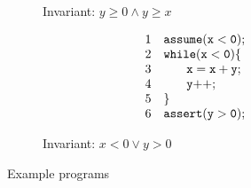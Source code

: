 \begin{figure}[t]
\begin{subfigure}{0.5\textwidth}
\[\begin{array}{ll}
\end{array}
\]
    \caption{Invariant: $y \geq 0 \land y \geq x$}
  \end{subfigure}%
   \begin{subfigure}{0.5\textwidth}
     \vspace{0.3cm}
      \[
      \begin{array}{ll}
      1 & \code{assume(x < 0);} \\
      2 & \code{while(x < 0)\{}  \\
      3 & \code{~~~ \quad x = x + y;}  \\
      4 & \code{~~~ \quad y{++};}  \\
      5 & \code{\}} \\
      6 & \code{assert(y > 0);}
      \end{array}
    \]
    \caption{Invariant: $x < 0 \lor y > 0$}
   \end{subfigure}
\caption{Example programs}
\label{fig:running:example}
\end{figure}

